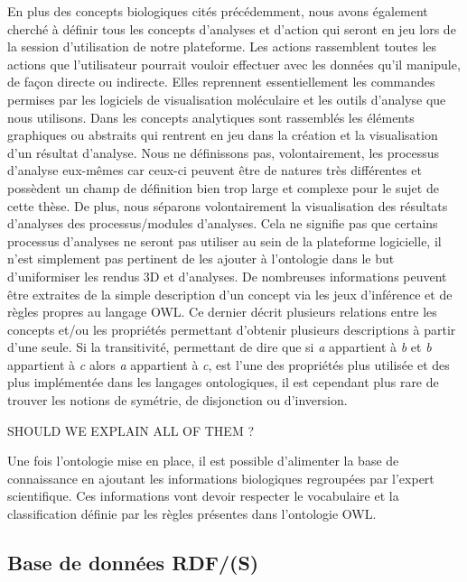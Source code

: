 En plus des concepts biologiques cités précédemment, nous avons également cherché à définir tous les concepts d'analyses et d'action qui seront en jeu lors de la session d'utilisation de notre plateforme. Les actions rassemblent toutes les actions que l'utilisateur pourrait vouloir effectuer avec les données qu'il manipule, de façon directe ou indirecte. Elles reprennent essentiellement les commandes permises par les logiciels de visualisation moléculaire et les outils d'analyse que nous utilisons. Dans les concepts analytiques sont rassemblés les éléments graphiques ou abstraits qui rentrent en jeu dans la création et la visualisation d'un résultat d'analyse. Nous ne définissons pas, volontairement, les processus d'analyse eux-mêmes car ceux-ci peuvent être de natures très différentes et possèdent un champ de définition bien trop large et complexe pour le sujet de cette thèse. De plus, nous séparons volontairement la visualisation des résultats d'analyses des processus/modules d'analyses. Cela ne signifie pas que certains processus d'analyses ne seront pas utiliser au sein de la plateforme logicielle, il n'est simplement pas pertinent de les ajouter à l'ontologie dans le but d'uniformiser les rendus 3D et d'analyses.
De nombreuses informations peuvent être extraites de la simple description d'un concept via les jeux d'inférence et de règles propres au langage OWL. Ce dernier décrit plusieurs relations entre les concepts et/ou les propriétés permettant d'obtenir plusieurs descriptions à partir d'une seule. Si la transitivité, permettant de dire que si \textit{a} appartient à \textit{b} et \textit{b} appartient à \textit{c} alors \textit{a} appartient à \textit{c},
est l'une des propriétés plus utilisée et des plus implémentée dans les langages ontologiques, il est cependant plus rare de trouver les notions de symétrie, de disjonction ou d'inversion. 

SHOULD WE EXPLAIN ALL OF THEM ?

Une fois l'ontologie mise en place, il est possible d'alimenter la base de connaissance en ajoutant les informations biologiques regroupées par l'expert scientifique. Ces informations vont devoir respecter le vocabulaire et la classification définie par les règles présentes dans l'ontologie OWL.

\subsection{Base de données RDF/(S)}

